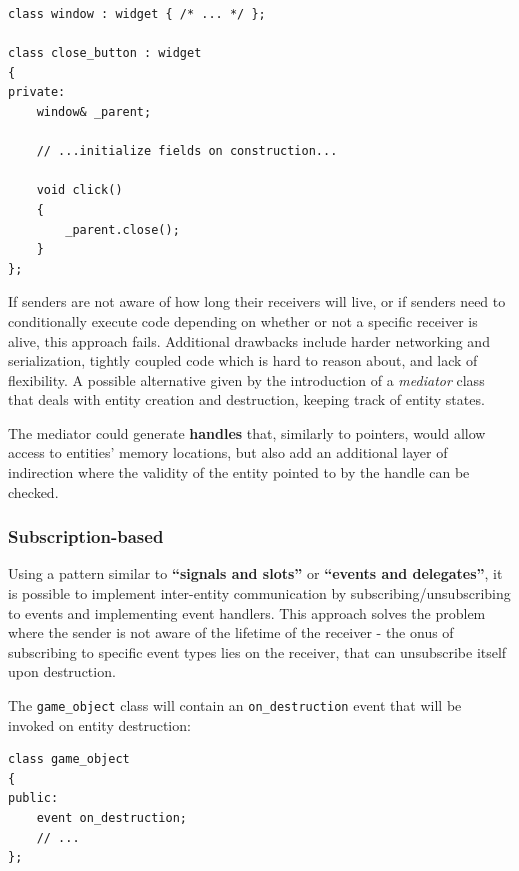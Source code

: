 \documentclass[oneside, 12pt, a4paper, openany]{book}
\begin{document}
\begin{verbatim}
class window : widget { /* ... */ };

class close_button : widget
{
private:
    window& _parent;

    // ...initialize fields on construction...

    void click()
    {
        _parent.close();
    }
};
\end{verbatim}

If senders are not aware of how long their receivers will live, or if
senders need to conditionally execute code depending on whether or not a
specific receiver is alive, this approach fails. Additional drawbacks
include harder networking and serialization, tightly coupled code which
is hard to reason about, and lack of flexibility. A possible alternative
given by the introduction of a \emph{mediator} class that deals with
entity creation and destruction, keeping track of entity states.

The mediator could generate \textbf{handles} that, similarly to
pointers, would allow access to entities' memory locations, but also add
an additional layer of indirection where the validity of the entity
pointed to by the handle can be checked.

\subsubsection{Subscription-based}\label{subscription-based}

Using a pattern similar to \textbf{``signals and slots''} or
\textbf{``events and delegates''}, it is possible to implement
inter-entity communication by subscribing/unsubscribing to events and
implementing event handlers. This approach solves the problem where the
sender is not aware of the lifetime of the receiver - the onus of
subscribing to specific event types lies on the receiver, that can
unsubscribe itself upon destruction.

The
\texttt{game_object}
class will contain an
\texttt{on_destruction}
event that will be invoked on entity destruction:

\begin{verbatim}
class game_object
{
public:
    event on_destruction;
    // ...
};
\end{verbatim}
\end{document}
